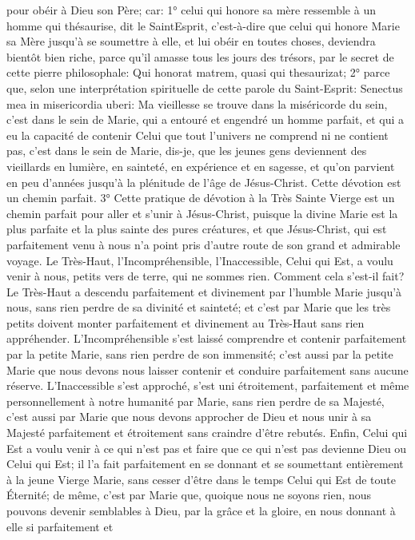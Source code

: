 pour obéir à Dieu son Père; car: 1° celui qui honore sa mère ressemble à un homme qui thésaurise, dit le SaintEsprit, c'est-à-dire que celui qui honore Marie sa Mère jusqu'à se soumettre à elle, et lui obéir en toutes choses,
deviendra bientôt bien riche, parce qu'il amasse tous les jours des trésors, par le secret de cette pierre
philosophale: Qui honorat matrem, quasi qui thesaurizat; 2° parce que, selon une interprétation spirituelle de cette
parole du Saint-Esprit: Senectus mea in misericordia uberi: Ma vieillesse se trouve dans la miséricorde du sein,
c'est dans le sein de Marie, qui a entouré et engendré un homme parfait, et qui a eu la capacité de contenir Celui
que tout l'univers ne comprend ni ne contient pas, c'est dans le sein de Marie, dis-je, que les jeunes gens
deviennent des vieillards en lumière, en sainteté, en expérience et en sagesse, et qu'on parvient en peu d'années
jusqu'à la plénitude de l'âge de Jésus-Christ.
Cette dévotion est un chemin parfait.
 3° Cette pratique de dévotion à la Très Sainte Vierge est un chemin parfait pour aller et s'unir à Jésus-Christ,
puisque la divine Marie est la plus parfaite et la plus sainte des pures créatures, et que Jésus-Christ, qui est
parfaitement venu à nous n'a point pris d'autre route de son grand et admirable voyage. Le Très-Haut,
l'Incompréhensible, l'Inaccessible, Celui qui Est, a voulu venir à nous, petits vers de terre, qui ne sommes rien.
Comment cela s'est-il fait? Le Très-Haut a descendu parfaitement et divinement par l'humble Marie jusqu'à nous,
sans rien perdre de sa divinité et sainteté; et c'est par Marie que les très petits doivent monter parfaitement et
divinement au Très-Haut sans rien appréhender. L'Incompréhensible s'est laissé comprendre et contenir
parfaitement par la petite Marie, sans rien perdre de son immensité; c'est aussi par la petite Marie que nous
devons nous laisser contenir et conduire parfaitement sans aucune réserve.
L'Inaccessible s'est approché, s'est uni étroitement, parfaitement et même personnellement à notre humanité par
Marie, sans rien perdre de sa Majesté, c'est aussi par Marie que nous devons approcher de Dieu et nous unir à sa
Majesté parfaitement et étroitement sans craindre d'être rebutés.
Enfin, Celui qui Est a voulu venir à ce qui n'est pas et faire que ce qui n'est pas devienne Dieu ou Celui qui Est; il
l'a fait parfaitement en se donnant et se soumettant entièrement à la jeune Vierge Marie, sans cesser d'être dans
le temps Celui qui Est de toute Éternité; de même, c'est par Marie que, quoique nous ne soyons rien, nous
pouvons devenir semblables à Dieu, par la grâce et la gloire, en nous donnant à elle si parfaitement et
